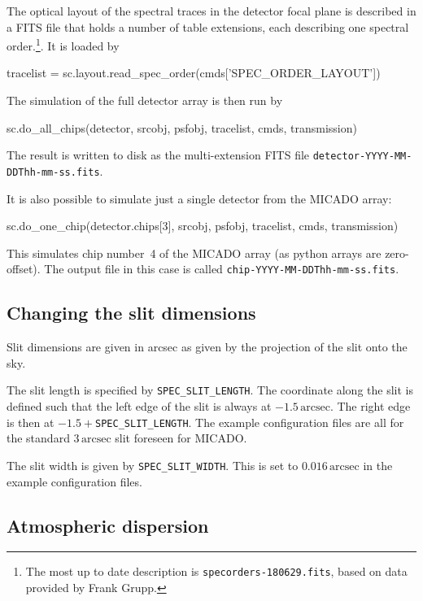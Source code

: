 \documentclass[a4paper,twoside,11pt]{article}
\begin{document}
The optical layout of the spectral traces in the detector focal plane
is described in a FITS file that holds a number of table extensions,
each describing one spectral order.\footnote{The most up to date
  description is \lstinline{specorders-180629.fits}, based on data
  provided by Frank Grupp.}. It is loaded by
\begin{pyin}
tracelist = sc.layout.read_spec_order(cmds['SPEC_ORDER_LAYOUT'])
\end{pyin}

The simulation of the full detector array is then run by
\begin{pyin}
sc.do_all_chips(detector, srcobj, psfobj, tracelist, cmds,
                transmission)
\end{pyin}
The result is written to disk as the multi-extension FITS file
\lstinline{detector-YYYY-MM-DDThh-mm-ss.fits}.

It is also possible to simulate just a single detector from the MICADO
array:
\begin{pyin}
sc.do_one_chip(detector.chips[3], srcobj, psfobj, tracelist, cmds,
               transmission)
\end{pyin}
This simulates chip number~4 of the MICADO array (as python arrays are
zero-offset). The output file in this case is called
\lstinline{chip-YYYY-MM-DDThh-mm-ss.fits}.

\subsection{Changing the slit dimensions}
\label{ssec:slit_length}

Slit dimensions are given in arcsec as given by the projection of the
slit onto the sky.

The slit length is specified by \lstinline{SPEC_SLIT_LENGTH}. The
coordinate along the slit is defined such that the left edge of the
slit is always at $-1.5\,\mathrm{arcsec}$. The right edge is then at
$-1.5 + $\lstinline{SPEC_SLIT_LENGTH}. The example configuration files
are all for the standard $3\,\mathrm{arcsec}$ slit foreseen for
MICADO.

The slit width is given by \lstinline{SPEC_SLIT_WIDTH}. This is set to
$0.016\,\mathrm{arcsec}$ in the example configuration files.


\subsection{Atmospheric dispersion}
\label{ssec:atmospheric_dispersion}
\end{document}
